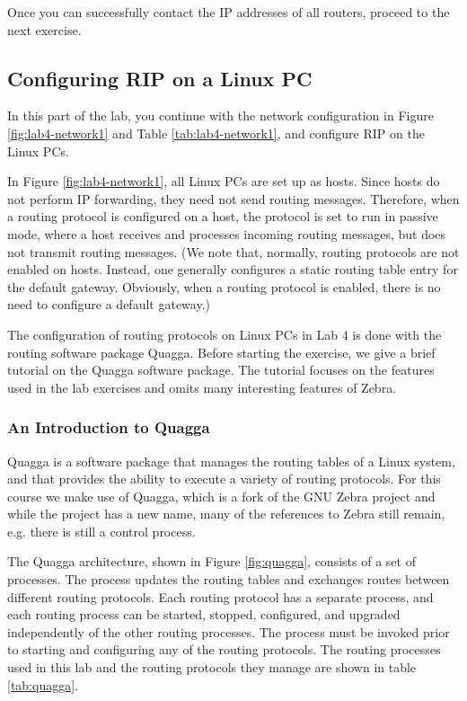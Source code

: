 Once you can successfully contact the IP addresses of all routers, proceed to the next exercise.

\newpage
\subsection{Configuring RIP on a Linux PC}

In this part of the lab, you continue with the network configuration in Figure \ref{fig:lab4-network1} and Table \ref{tab:lab4-network1}, and configure RIP on the Linux PCs.

In Figure \ref{fig:lab4-network1}, all Linux PCs are set up as hosts. Since hosts do not perform IP forwarding, they need not send routing messages. Therefore, when a routing protocol is configured on a host, the protocol is set to run in passive mode, where a host receives and processes incoming routing messages, but does not transmit routing messages. (We note that, normally, routing protocols are not enabled on hosts. Instead, one generally configures a static routing table entry for the default gateway. Obviously, when a routing protocol is enabled, there is no need to configure a default gateway.)

The configuration of routing protocols on Linux PCs in Lab 4 is done with the routing software package Quagga. Before starting the exercise, we give a brief tutorial on the Quagga software package. The tutorial focuses on the features used in the lab exercises and omits many interesting features of Zebra.

\subsubsection*{An Introduction to Quagga}

Quagga is a software package that manages the routing tables of a Linux system, and that provides the ability to execute a variety of routing protocols. For this course we make use of Quagga, which is a fork of the GNU Zebra project and while the project has a new name, many of the references to Zebra still remain, e.g. there is still a  control process.

The Quagga architecture, shown in Figure \ref{fig:quagga}, consists of a set of processes. The process  updates the routing tables and exchanges routes between different routing protocols. Each routing protocol has a separate process, and each routing process can be started, stopped, configured, and upgraded independently of the other routing processes. The process  must be invoked prior to starting and configuring any of the routing protocols. The routing processes used in this lab and the routing protocols they manage are shown in table \ref{tab:quagga}.

